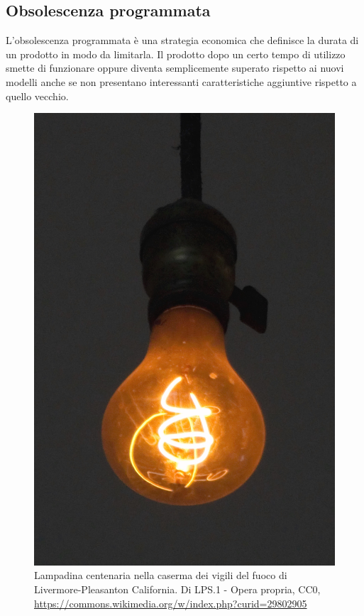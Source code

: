 \documentclass[12pt]{book} %
\begin{document}
\subsection{Obsolescenza programmata}
L'obsolescenza programmata è una strategia economica che definisce la durata di un prodotto in modo
da limitarla. Il prodotto dopo un certo tempo di utilizzo smette di funzionare oppure diventa semplicemente superato
rispetto ai nuovi modelli anche se non presentano interessanti caratteristiche aggiuntive rispetto a quello vecchio.

\begin{figure}
  \centering
  \includegraphics[width=0.95\linewidth]{images/Libro-img051.jpg}
  \begin{minipage}{\linewidth}
    \caption{Lampadina centenaria nella caserma dei vigili del
fuoco di Livermore-Pleasanton California. Di LPS.1 - Opera propria, CC0,
\protect\url{https://commons.wikimedia.org/w/index.php?curid=29802905}}
  \end{minipage}
\end{figure}
\end{document}
